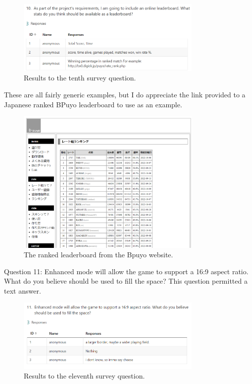 \documentclass{report}
\begin{document}
\begin{figure}[ht]
    \centering
    \includegraphics[width=0.8\textwidth]{survey10.png}
    \caption{\label{fig:survey10}Results to the tenth survey question.}
\end{figure}

These are all fairly generic examples, but I do appreciate the link provided to a Japanese ranked BPuyo leaderboard to use as an example.

\begin{figure}[ht]
    \centering
    \includegraphics[width=0.8\textwidth]{bpuyo_leaderboard.png}
    \caption{\label{fig:bpuyo_leaderboard}The ranked leaderboard from the Bpuyo website.}
\end{figure}

Question 11: Enhanced mode will allow the game to support a 16:9 aspect ratio. What do you believe should be used to fill the space?
This question permitted a text answer.

\begin{figure}[ht]
    \centering
    \includegraphics[width=0.8\textwidth]{survey11.png}
    \caption{\label{fig:survey11}Results to the eleventh survey question.}
\end{figure}
\end{document}
